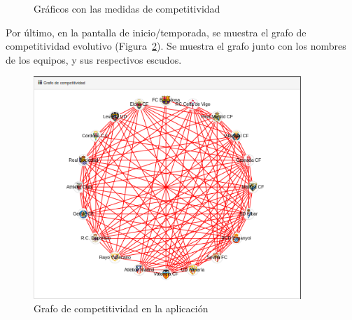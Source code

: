 \begin{figure}[htbp]
\centering
{}
\caption{Gráficos con las medidas de competitividad} \label{fig:medidas}
\end{figure} 

Por último, en la pantalla de inicio/temporada, se muestra el grafo de competitividad evolutivo (Figura~\ref{fig:inicio-grafo}). Se muestra el grafo junto con los nombres de los equipos, y sus respectivos escudos.\\


\begin{figure}[htb]
\centering
\includegraphics[width=0.9\textwidth]{imagenes/pantallazos-aplicacion/inicio-grafo}
\caption{Grafo de competitividad en la aplicación}
\label{fig:inicio-grafo}
\end{figure}

